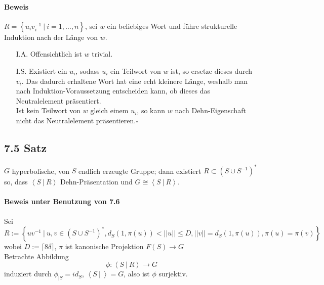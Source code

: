 \documentclass{article}
\newcommand{\set}[2]{\left\lbrace #1~|~#2 \right\rbrace}
\newcommand{\grp}[2]{\left\langle #1~|~#2 \right\rangle}
\newcommand{\qed}{\hfill $\square$}
\newcommand{\norm}[1]{\left|\left|#1\right|\right|}
\begin{document}
\paragraph{Beweis}
$R = \set{u_iv_i^{-1}}{i = 1,\ldots, n}$, sei $w$ ein beliebiges Wort und führe strukturelle Induktion nach der Länge von $w$.
\begin{enumerate}
	\item[I.A.] Offensichtlich ist $w$ trivial.
	\item[I.S.] Existiert ein $u_i$, sodass $u_i$ ein Teilwort von $w$ ist, so ersetze dieses durch $v_i$. Das dadurch erhaltene Wort hat eine echt kleinere Länge, weshalb man nach Induktion-Voraussetzung entscheiden kann, ob dieses das Neutralelement präsentiert.\\
	Ist kein Teilwort von $w$ gleich einem $u_i$, so kann $w$ nach Dehn-Eigenschaft nicht das Neutralelement präsentieren.\qed
\end{enumerate}

\subsection{7.5 Satz}
$G$ hyperbolische, von $S$ endlich erzeugte Gruppe; dann existiert $R \subset (S\cup S^{-1})^*$ so, dass $\grp{S}{R}$ Dehn-Präsentation und $G \cong \grp{S}{R}$.

\paragraph{Beweis unter Benutzung von 7.6}
Sei $R := \set{uv^{-1}}{u,v \in (S\cup S^{-1})^*, d_S(1, \pi(u)) < \norm{u} \leq D, \norm{v} = d_S(1, \pi(u)), \pi(u) = \pi(v) } $ wobei $D:= \lceil8\delta \rceil$, $\pi$ ist kanonische Projektion $F(S) \rightarrow G$\\ %
Betrachte Abbildung
\[\phi : \grp{S}{R} \rightarrow G \]
induziert durch $\phi_{|S} = id_{S}$, $\grp{S}{} = G$, also ist $\phi$ surjektiv.\\
\end{document}
